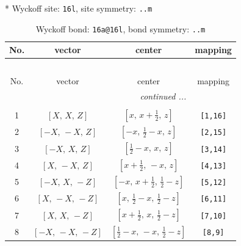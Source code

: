 \documentclass[fleqn,8pt]{jsarticle}
\begin{document}
* Wyckoff site: {\tt 16l}, site symmetry: {\tt ..m}
\renewcommand{\arraystretch}{1.2}
\begin{longtable}{cccc}
\caption{Wyckoff bond: {\tt 16a@16l}, bond symmetry: {\tt ..m}}
 \\
 \hline \hline
No. & vector & center & mapping \\ \hline \endfirsthead

\multicolumn{3}{l}{\tablename\ \thetable{}} \\
 \hline \hline
No. & vector & center & mapping \\ \hline \endhead

 \hline \hline
\multicolumn{3}{r}{\footnotesize\it continued ...} \\ \endfoot

 \hline \hline
\multicolumn{3}{r}{} \\ \endlastfoot

1 & $\left[ X,\, X,\, Z \right]$ & $\left[ x,\, x + \frac{1}{2},\, z \right]$ & {\tt [1,16]} \\ \hline
2 & $\left[ - X,\, - X,\, Z \right]$ & $\left[ - x,\, \frac{1}{2} - x,\, z \right]$ & {\tt [2,15]} \\ \hline
3 & $\left[ - X,\, X,\, Z \right]$ & $\left[ \frac{1}{2} - x,\, x,\, z \right]$ & {\tt [3,14]} \\ \hline
4 & $\left[ X,\, - X,\, Z \right]$ & $\left[ x + \frac{1}{2},\, - x,\, z \right]$ & {\tt [4,13]} \\ \hline
5 & $\left[ - X,\, X,\, - Z \right]$ & $\left[ - x,\, x + \frac{1}{2},\, \frac{1}{2} - z \right]$ & {\tt [5,12]} \\ \hline
6 & $\left[ X,\, - X,\, - Z \right]$ & $\left[ x,\, \frac{1}{2} - x,\, \frac{1}{2} - z \right]$ & {\tt [6,11]} \\ \hline
7 & $\left[ X,\, X,\, - Z \right]$ & $\left[ x + \frac{1}{2},\, x,\, \frac{1}{2} - z \right]$ & {\tt [7,10]} \\ \hline
8 & $\left[ - X,\, - X,\, - Z \right]$ & $\left[ \frac{1}{2} - x,\, - x,\, \frac{1}{2} - z \right]$ & {\tt [8,9]} \\
\end{longtable}
\renewcommand{\arraystretch}{1.2}
\end{document}
